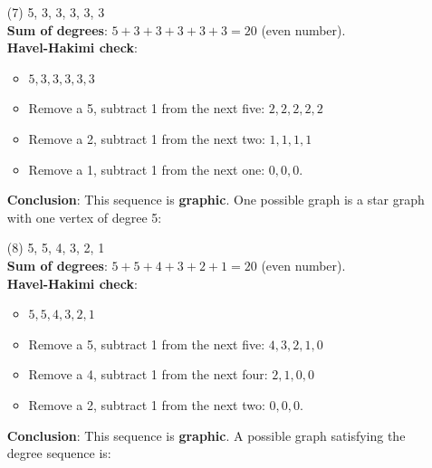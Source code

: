 \documentclass[12pt]{article}
\begin{document}
\begin{itemize}
\begin{itemize}
    \item[(7)]  {5, 3, 3, 3, 3, 3} \\
    \textbf{Sum of degrees}: \( 5 + 3 + 3 + 3 + 3 + 3 = 20 \) (even number). \\
    \textbf{Havel-Hakimi check}:
    \begin{itemize}
        \item \( 5, 3, 3, 3, 3, 3 \)
        \item Remove a 5, subtract 1 from the next five: \( 2, 2, 2, 2, 2 \)
        \item Remove a 2, subtract 1 from the next two: \( 1, 1, 1, 1 \)
        \item Remove a 1, subtract 1 from the next one: \( 0, 0, 0 \).
    \end{itemize}
    \textbf{Conclusion}: This sequence is \textbf{graphic}. One possible graph is a star graph with one vertex of degree 5: \\
    \item[(8)]  {5, 5, 4, 3, 2, 1} \\
    \textbf{Sum of degrees}: \( 5 + 5 + 4 + 3 + 2 + 1 = 20 \) (even number). \\
    \textbf{Havel-Hakimi check}:
    \begin{itemize}
        \item \( 5, 5, 4, 3, 2, 1 \)
        \item Remove a 5, subtract 1 from the next five: \( 4, 3, 2, 1, 0 \)
        \item Remove a 4, subtract 1 from the next four: \( 2, 1, 0, 0 \)
        \item Remove a 2, subtract 1 from the next two: \( 0, 0, 0 \).
    \end{itemize}
    \textbf{Conclusion}: This sequence is \textbf{graphic}. A possible graph satisfying the degree sequence is: \\
\end{itemize}
\end{itemize}
\end{document}

